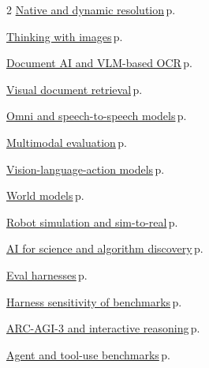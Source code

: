 \documentclass[10pt,a4paper,openany]{report}
\begin{document}
\begin{multicols}{2}
\hyperref[c:vlm-2]{Native and dynamic resolution}\,{\color{muted}\scriptsize p.\,\pageref{c:vlm-2}}\par\vspace{1pt}
\hyperref[c:vlm-3]{Thinking with images}\,{\color{muted}\scriptsize p.\,\pageref{c:vlm-3}}\par\vspace{1pt}
\hyperref[c:vlm-4]{Document AI and VLM-based OCR}\,{\color{muted}\scriptsize p.\,\pageref{c:vlm-4}}\par\vspace{1pt}
\hyperref[c:vlm-5]{Visual document retrieval}\,{\color{muted}\scriptsize p.\,\pageref{c:vlm-5}}\par\vspace{1pt}
\hyperref[c:vlm-7]{Omni and speech-to-speech models}\,{\color{muted}\scriptsize p.\,\pageref{c:vlm-7}}\par\vspace{1pt}
\hyperref[c:vlm-9]{Multimodal evaluation}\,{\color{muted}\scriptsize p.\,\pageref{c:vlm-9}}\par\vspace{1pt}
\hyperref[c:embodied-0]{Vision-language-action models}\,{\color{muted}\scriptsize p.\,\pageref{c:embodied-0}}\par\vspace{1pt}
\hyperref[c:embodied-2]{World models}\,{\color{muted}\scriptsize p.\,\pageref{c:embodied-2}}\par\vspace{1pt}
\hyperref[c:embodied-4]{Robot simulation and sim-to-real}\,{\color{muted}\scriptsize p.\,\pageref{c:embodied-4}}\par\vspace{1pt}
\hyperref[c:embodied-7]{AI for science and algorithm discovery}\,{\color{muted}\scriptsize p.\,\pageref{c:embodied-7}}\par\vspace{1pt}
\hyperref[c:evals-0]{Eval harnesses}\,{\color{muted}\scriptsize p.\,\pageref{c:evals-0}}\par\vspace{1pt}
\hyperref[c:evals-1]{Harness sensitivity of benchmarks}\,{\color{muted}\scriptsize p.\,\pageref{c:evals-1}}\par\vspace{1pt}
\hyperref[c:evals-4]{ARC-AGI-3 and interactive reasoning}\,{\color{muted}\scriptsize p.\,\pageref{c:evals-4}}\par\vspace{1pt}
\hyperref[c:evals-5]{Agent and tool-use benchmarks}\,{\color{muted}\scriptsize p.\,\pageref{c:evals-5}}\par\vspace{1pt}

\end{multicols}
\end{document}
